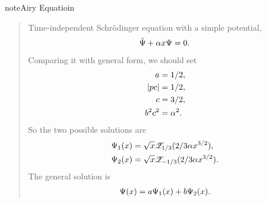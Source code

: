 \documentclass[letterpaper,10pt,english]{sphinxmanual}
\begin{document}
\begin{notice}{note}{Airy Equatioin}
\begin{quote}

Time-independent Schrödinger equation with a simple potential,
\begin{gather}
\begin{split}\ddot{\Psi} + \alpha x \Psi  = 0.\end{split}\notag
\end{gather}
Comparing it with general form, we should set
\begin{gather}
\begin{split}a & = 1/2, \\
\lvert p c \rvert & = 1/2, \\
c & = 3/2, \\
b^2 c^2 & = \alpha^2.\end{split}\notag
\end{gather}
So the two possible solutions are
\begin{gather}
\begin{split}\Psi_1(x) & = \sqrt{x} \mathscr{Z}_{1/3}(2/3 \alpha x^{3/2}), \\
\Psi_2(x) & = \sqrt{x} \mathscr{Z}_{-1/3}(2/3 \alpha x^{3/2}).\end{split}\notag
\end{gather}
The general solution is
\begin{gather}
\begin{split}\Psi(x) = a \Psi_1(x) + b \Psi_2(x).\end{split}\notag
\end{gather}\end{quote}
\end{notice}
\end{document}
